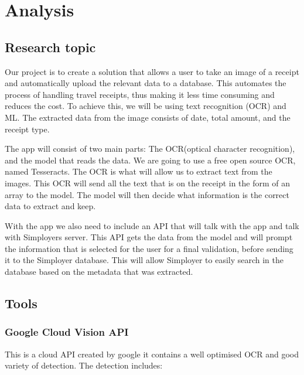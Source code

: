 \cleardoublepage
\chapter{Analysis}
\label{ch:analysis}

\section{Research topic}\label{sec:research-topic}

Our project is to create a solution that allows a user to take an image of a receipt and automatically upload the relevant data to a database.
This automates the process of handling travel receipts, thus making it less time consuming and reduces the cost.
To achieve this, we will be using text recognition (OCR) and ML\@.
The extracted data from the image consists of date, total amount, and the receipt type.

The app will consist of two main parts: The OCR(optical character recognition), and the model that reads the data.
We are going to use a free open source OCR, named Tesseracts.
The OCR is what will allow us to extract text from the images.
This OCR will send all the text that is on the receipt in the form of an array to the model.
The model will then decide what information is the correct data to extract and keep.

With the app we also need to include an API that will talk with the app and talk with Simployers server.
This API gets the data from the model and will prompt the information that is selected for the user for a final
validation, before sending it to the Simployer database.
This will allow Simployer to easily search in the database based on the metadata that was extracted.

\section{Tools}\label{sec:tools}
\subsection{Google Cloud Vision API}\label{subsec:API_Google}

This is a cloud API created by google it contains a well optimised OCR and good variety of detection.
The detection includes:

